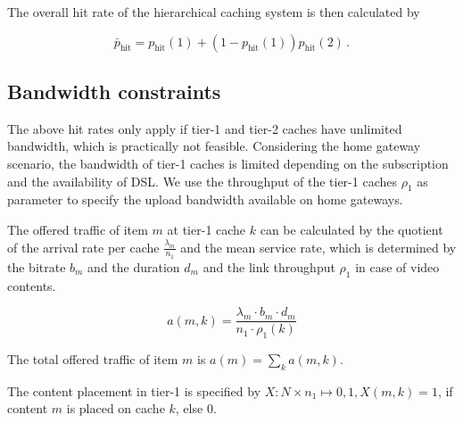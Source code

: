 The overall hit rate of the hierarchical caching system is then calculated by

\begin{equation}
\bar{p}_\text{hit} = p_\text{hit}(1)+(1-p_\text{hit}(1))p_\text{hit}(2) \, .
\end{equation}


\subsection{Bandwidth constraints}

The above hit rates only apply if tier-1 and tier-2 caches have unlimited bandwidth, which is practically not feasible.
Considering the home gateway scenario, the bandwidth of tier-1 caches is limited depending on the subscription and the availability of DSL.
We use the throughput of the tier-1 caches $\rho_1$ as parameter to specify the upload bandwidth available on home gateways.




The offered traffic of item $m$ at tier-1 cache $k$ can be calculated by the quotient of the arrival rate per cache $\frac{\lambda_m}{n_1}$ and the mean service rate, which is determined by the bitrate $b_m$ and the duration $d_m$ and the link throughput $\rho_1$ in case of video contents.

\begin{equation}
a(m,k) = \frac{\lambda_m \cdot b_m \cdot d_m}{n_1\cdot \rho_1(k)}
\end{equation}

The total offered traffic of item $m$ is $a(m) = \sum_k a(m,k)$.


The content placement in tier-1 is specified by $X: N \times n_1\mapsto {0,1}, X(m,k) = 1$, if content $m$ is placed on cache $k$, else $0$.

